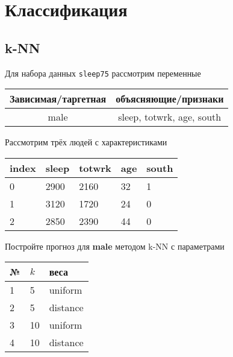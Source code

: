 
\section{Классификация}

\subsection{k-NN}

\begin{exercise}
Для набора данных \texttt{sleep75} рассмотрим переменные
\begin{center}
	\begin{tabular}{|c|c|} \hline
		Зависимая/таргетная & объясняющие/признаки \\ \hline
		male & sleep, totwrk, age, south \\ \hline
	\end{tabular}
\end{center}
Рассмотрим трёх людей с характеристиками
\begin{center}
	\begin{tabular}{|l||l|l|l|l|}\hline
		index & sleep & totwrk & age & south  \\ \hline\hline
		0 & 2900 & 2160 & 32 & 1  \\
		1 & 3120 & 1720 & 24 & 0  \\
		2 & 2850 & 2390 & 44 & 0  \\ \hline
	\end{tabular}
\end{center}
Постройте прогноз для \textbf{male} методом k-NN с параметрами
\begin{center}
	\begin{tabular}{|l|l|l|}\hline
	№ & \(k\) & веса \\ \hline
	1 & 5 & uniform \\
	2 & 5 & distance \\
	3 & 10 & uniform \\
	4 & 10 & distance \\ \hline
	\end{tabular}
\end{center}
\end{exercise}

